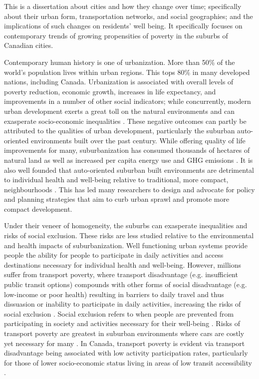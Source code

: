 


This is a dissertation about cities and how they change over time; specifically about their urban form, transportation networks, and social geographies; and the implications of such changes on residents' well being. It specifically focuses on contemporary trends of growing propensities of poverty in the suburbs of Canadian cities.


Contemporary human history is one of urbanization. More than 50\% of the world's population lives within urban regions. This tops 80\% in many developed nations, including Canada. Urbanization is associated with overall levels of poverty reduction, economic growth, increases in life expectancy, and improvements in a number of other social indicators; while concurrently, modern urban development exerts a great toll on the natural environments and can exasperate socio-economic inequalities \cite{whitmee_safeguarding_2015}. These negative outcomes can partly be attributed to the qualities of urban development, particularly the suburban auto-oriented environments built over the past century. While offering quality of life improvements for many, suburbanization has consumed thousands of hectares of natural land as well as increased per capita energy use and GHG emissions \cite{ewing_compactness_2015}. It is also well founded that auto-oriented suburban built environments are detrimental to individual health and well-being relative to traditional, more compact, neighbourhoods . This has led many researchers to design and advocate for policy and planning strategies that aim to curb urban sprawl and promote more compact development.



Under their veneer of homogeneity, the suburbs can exasperate inequalities and risks of social exclusion. These risks are less studied relative to the environmental and health impacts of suburbanization. Well functioning urban systems provide people the ability for people to participate in daily activities and access destinations necessary for individual health and well-being. However, millions suffer from transport poverty, where transport disadvantage (e.g. insufficient public transit options) compounds with other forms of social disadvantage (e.g. low-income or poor health) resulting in barriers to daily travel and thus dissuasion or inability to participate in daily activities, increasing the risks of social exclusion \cite{lucas_transport_2012}. Social exclusion refers to when people are prevented from participating in society and activities necessary for their well-being \cite{levitas_multi-dimensional_2007}. Risks of transport poverty are greatest in suburban environments where cars are costly yet necessary for many \cite{allen_sizing_2019}. In Canada, transport poverty is evident via transport disadvantage being associated with low activity participation rates, particularly for those of lower socio-economic status living in areas of low transit accessibility . 


